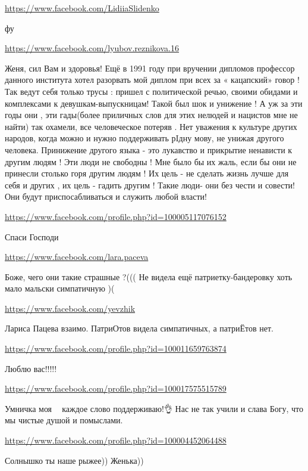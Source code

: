 \documentclass[a4paper,11pt]{extreport}
\begin{document}
\begin{itemize}
\begin{itemize}
\end{itemize}
\url{https://www.facebook.com/LidiiaSlidenko}

фу

\url{https://www.facebook.com/lyubov.reznikova.16}

Женя, сил Вам и здоровья!
Ещё в 1991 году при вручении дипломов профессор данного института хотел разорвать мой диплом при всех за « кацапский» говор ! Так ведут себя только трусы : пришел с политической речью, своими обидами и комплексами к девушкам-выпускницам! Такой был шок и унижение ! А уж за эти годы они , эти гады(более приличных слов для этих нелюдей и нацистов мне не найти) так охамели, все человеческое потеряв . Нет уважения к культуре других народов, когда можно и нужно поддерживать рIдну мову, не унижая другого человека. Принижение другого языка - это лукавство и прикрытие ненависти к другим людям ! Эти люди не свободны ! Мне было бы их жаль, если бы они не принесли столько горя другим людям ! Их цель - не сделать жизнь лучше для себя и других , их цель - гадить другим !
Такие люди- они без чести и совести! Они будут приспосабливаться и служить любой власти!

\url{https://www.facebook.com/profile.php?id=100005117076152}

Спаси Господи

\url{https://www.facebook.com/lara.paceva}

Боже, чего они такие страшные ?((( Не видела ещё патриетку-бандеровку хоть мало мальски симпатичную )(

\begin{itemize}
\url{https://www.facebook.com/yevzhik}

Лариса Пацева взаимо. ПатриОтов видела симпатичных, а патриЁтов нет.

\end{itemize}
\url{https://www.facebook.com/profile.php?id=100011659763874}

Люблю вас!!!!!

\url{https://www.facebook.com/profile.php?id=100017575515789}

Умничка моя 🤗😘 каждое слово поддерживаю!👌 Нас не так учили и слава Богу, что мы чистые душой и помыслами.

\url{https://www.facebook.com/profile.php?id=100004452064488}

Солнышко ты наше рыжее)) Женька))


\end{itemize}
\end{document}
